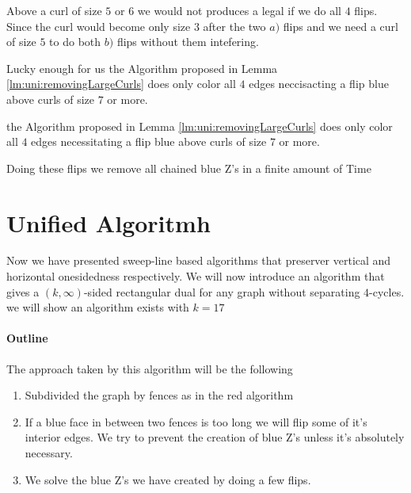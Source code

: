 Above a curl of size $5$ or $6$ we would not produces a legal \rel if we do all $4$ flips. Since the curl would become only size $3$ after the two $a)$ flips and we need a curl of size $5$ to do both $b)$ flips without them intefering.

Lucky enough for us the Algorithm proposed in Lemma \ref{lm:uni:removingLargeCurls} does only color all $4$ edges neccisacting a flip blue above curls of size $7$ or more.


\begin{lemma}
  \label{lm:}
  the Algorithm proposed in Lemma \ref{lm:uni:removingLargeCurls} does only color all $4$ edges necessitating a flip blue above curls of size $7$ or more.
\end{lemma}


\begin{lemma}
  \label{lm:uni:flips}
  Doing these flips we remove all chained blue Z's in a finite amount of Time
\end{lemma}%


\section{Unified Algoritmh}

Now we have presented sweep-line based algorithms that preserver vertical and horizontal onesidedness respectively. We will now introduce an algorithm that gives a $(k,\infty)$-sided rectangular dual for any graph without separating $4$-cycles. we will show an algorithm exists with $k=17$

\paragraph{Outline}
The approach taken by this algorithm will be the following
\begin{enumerate}
  \item Subdivided the graph by fences as in the red algorithm
  \item If a blue face in between two fences is too long we will flip some of it's interior edges. We try to prevent the creation of blue Z's unless it's absolutely necessary.
  \item We solve the blue Z's we have created by doing a few flips.
\end{enumerate}


